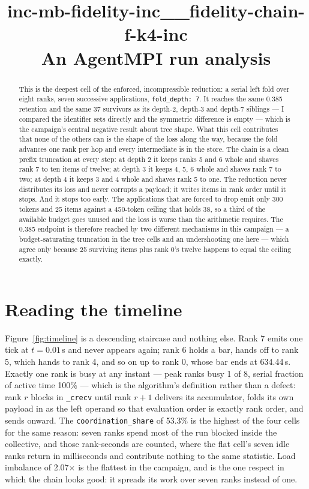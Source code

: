 \documentclass[11pt]{article}
\title{\textbf{inc-mb-fidelity-inc\_\_fidelity-chain-f-k4-inc}\\[2pt]\large An AgentMPI run analysis}
\author{}
\date{}
\begin{document}
\maketitle

\begin{abstract}
This is the deepest cell of the enforced, incompressible reduction: a serial left fold over
eight ranks, seven successive applications, \texttt{fold\_depth: 7}. It reaches the same
0.385 retention and the same 37 survivors as its depth-2, depth-3 and depth-7 siblings ---
I compared the identifier sets directly and the symmetric difference is empty --- which is
the campaign's central negative result about tree shape. What this cell contributes that
none of the others can is the shape of the loss along the way, because the fold advances
one rank per hop and every intermediate is in the store. The chain is a clean prefix
truncation at every step: at depth 2 it keeps ranks 5 and 6 whole and shaves rank 7 to ten
items of twelve; at depth 3 it keeps 4, 5, 6 whole and shaves rank 7 to two; at depth 4 it
keeps 3 and 4 whole and shaves rank 5 to one. The reduction never distributes its loss and
never corrupts a payload; it writes items in rank order until it stops. And it stops too
early. The applications that are forced to drop emit only 300 tokens and 25 items against a
450-token ceiling that holds 38, so a third of the available budget goes unused and the
loss is worse than the arithmetic requires. The 0.385 endpoint is therefore reached by two
different mechanisms in this campaign --- a budget-saturating truncation in the tree cells
and an undershooting one here --- which agree only because 25 surviving items plus rank 0's
twelve happens to equal the ceiling exactly.
\end{abstract}



\section{Reading the timeline}

Figure~\ref{fig:timeline} is a descending staircase and nothing else. Rank 7 emits one
tick at $t = 0.01$\,s and never appears again; rank 6 holds a bar, hands off to rank 5,
which hands to rank 4, and so on up to rank 0, whose bar ends at 634.44\,s. Exactly one
rank is busy at any instant --- peak ranks busy 1 of 8, serial fraction of active time
100\% --- which is the algorithm's definition rather than a defect: rank $r$ blocks in
\texttt{\_crecv} until rank $r+1$ delivers its accumulator, folds its own payload in as the
left operand so that evaluation order is exactly rank order, and sends onward. The
\texttt{coordination\_share} of 53.3\% is the highest of the four cells for the same
reason: seven ranks spend most of the run blocked inside the collective, and those
rank-seconds are counted, where the flat cell's seven idle ranks return in milliseconds
and contribute nothing to the same statistic. Load imbalance of 2.07$\times$ is the
flattest in the campaign, and is the one respect in which the chain looks good: it spreads
its work over seven ranks instead of one.
\end{document}
